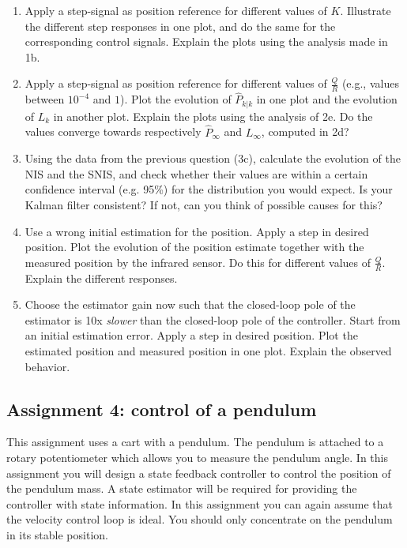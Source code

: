 \documentclass[10pt,a4paper]{article}
\begin{document}
\begin{enumerate}
\begin{enumerate}
    \item Apply a step-signal as position reference for different values of $K$. Illustrate the different step responses in one plot, and do the same for the corresponding control signals. Explain the plots using the analysis made in 1b.
    \item Apply a step-signal as position reference for different values of $\frac{Q}{R}$ (e.g., values between $10^{-4}$ and $1$). Plot the evolution of $\hat{P}_{k|k}$ in one plot and the evolution of $L_{k}$ in another plot. Explain the plots using the analysis of 2e. Do the values converge towards respectively $\hat{P}_\infty$ and $L_\infty$, computed in 2d?
    \item Using the data from the previous question (3c), calculate the evolution of the NIS and the SNIS, and check whether their values are within a certain confidence interval (e.g. 95\%) for the distribution you would expect. Is your Kalman filter consistent? If not, can you think of possible causes for this?
    \item Use a wrong initial estimation for the position. Apply a step in desired position. Plot the evolution of the position estimate together with the measured position by the infrared sensor. Do this for different values of $\frac{Q}{R}$. Explain the different responses.
    \item Choose the estimator gain now such that the closed-loop pole of the estimator is 10x \emph{slower} than the closed-loop pole of the controller. Start from an initial estimation error. Apply a step in desired position. Plot the estimated position and measured position in one plot. Explain the observed behavior.
  \end{enumerate}
\end{enumerate}

\subsection{Assignment 4: control of a pendulum}
This assignment uses a cart with a pendulum. The pendulum is attached to a rotary potentiometer which allows you to measure the pendulum angle. In this assignment you will design a state feedback controller to control the position of the pendulum mass. A state estimator will be required for providing the controller with state information. In this assignment you can again assume that the velocity control loop is ideal. You should only concentrate on the pendulum in its stable position.
\end{document}
